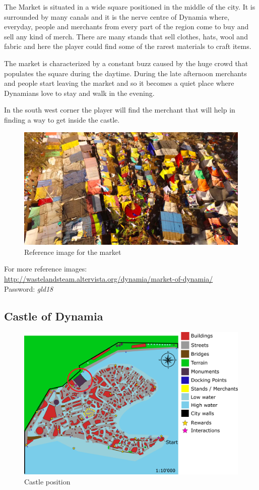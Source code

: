 The Market is situated in a wide square positioned in the middle of the city. It is surrounded by many canals and it is the nerve centre of Dynamia where, everyday, people and merchants from every part of the region come to buy and sell any kind of merch. There are many stands that sell clothes, hats, wool and fabric and here the player could find some of the rarest materials to craft items.

The market is characterized by a constant buzz caused by the huge crowd that populates  the square during the daytime. During the late afternoon merchants and people start leaving the market and so it becomes a quiet place where Dynamians love to stay and walk in the evening.

In the south west corner the player will find the merchant that will help in finding a way to get inside the castle.
 
\begin{figure}[H]
  \centering
  \includegraphics[width=\textwidth]{Images/Landmarks/market}
  \caption{Reference image for the market}
\end{figure}

For more reference images: \url{http://wastelandsteam.altervista.org/dynamia/market-of-dynamia/}\\
Password: \textit{gld18}

\subsection{Castle of Dynamia}
\begin{figure}[H]
  \centering
  \includegraphics[width=12cm]{Images/Maps/dynamia_castleOfDynamia}
  \caption{Castle position}
\end{figure}

